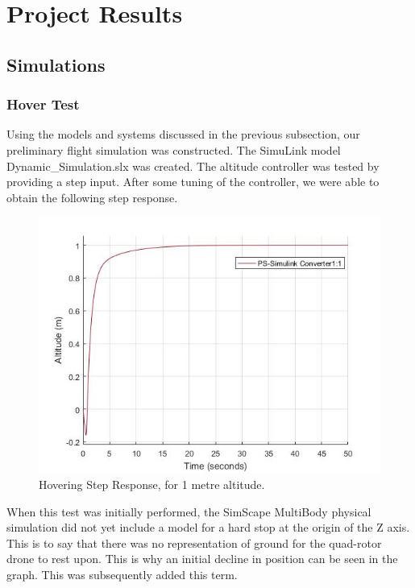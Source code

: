 
\section{Project Results}

\subsection{Simulations}
\subsubsection{Hover Test}
Using the models and systems discussed in the previous subsection, our preliminary flight simulation was constructed.  The SimuLink model Dynamic\_Simulation.slx was created.  The altitude controller was tested by providing a step input.  After some tuning of the controller, we were able to obtain the following step response.

\begin{figure}[h]
	\centering
	\includegraphics[scale = 0.5]{stepresponse.jpg}
	\caption{Hovering Step Response, for 1 metre altitude.}
	\label{fig:1m_step}
\end{figure}

When this test was initially performed, the SimScape MultiBody physical simulation did not yet include a model for a hard stop at the origin of the Z axis.  This is to say that there was no representation of ground for the quad-rotor drone to rest upon.  This is why an initial decline in position can be seen in the graph.  This was subsequently added this term.

